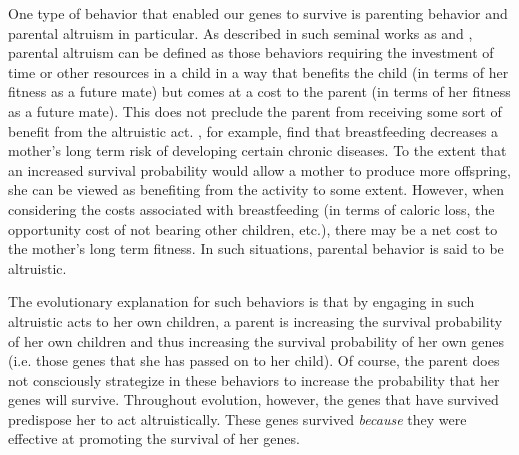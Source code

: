 \documentclass[1p, review]{elsarticle}\usepackage[]{graphicx}\usepackage[]{color}
\begin{document}
One type of behavior that enabled our genes to survive is parenting behavior and parental altruism in particular. As described in such seminal works as \citet{Hamilton1964} and \citet{Trivers1974}, parental altruism can be defined as those behaviors requiring the investment of time or other resources in a child in a way that benefits the child (in terms of her fitness as a future mate) but comes at a cost to the parent (in terms of her fitness as a future mate). This does not preclude the parent from receiving some sort of benefit from the altruistic act. \citet{Stuebe2010}, for example, find that breastfeeding decreases a mother's long term risk of developing certain chronic diseases. To the extent that an increased survival probability would allow a mother to produce more offspring, she can be viewed as benefiting from the activity to some extent. However, when considering the costs associated with breastfeeding (in terms of caloric loss, the opportunity cost of not bearing other children, etc.), there may be a net cost to the mother's long term fitness. In such situations, parental behavior is said to be altruistic. 

The evolutionary explanation for such behaviors is that by engaging in such altruistic acts to her own children, a parent is increasing the survival probability of her own children and thus increasing the survival probability of her own genes (i.e. those genes that she has passed on to her child). Of course, the parent does not consciously strategize in these behaviors to increase the probability that her genes will survive. Throughout evolution, however, the genes that have survived predispose her to act altruistically. These genes survived \emph{because} they were effective at promoting the survival of her genes. 
\end{document}
